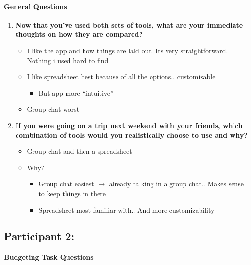 \documentclass[12pt,a4paper]{article}
\begin{document}
\paragraph{General Questions}

\begin{enumerate}
    \item \textbf{Now that you’ve used both sets of tools, what are your immediate thoughts on how they are compared?}
    \begin{itemize}
        \item I like the app and how things are laid out. Its very straightforward. Nothing i used hard to find
        \item I like spreadsheet best because of all the options.. customizable
        \begin{itemize}
            \item But app more ``intuitive''
        \end{itemize}
        \item Group chat worst
    \end{itemize}

    \item \textbf{If you were going on a trip next weekend with your friends, which combination of tools would you realistically choose to use and why?}
    \begin{itemize}
        \item Group chat and then a spreadsheet
        \item Why?
        \begin{itemize}
            \item Group chat easiest $\rightarrow$ already talking in a group chat.. Makes sense to keep things in there
            \item Spreadsheet most familiar with.. And more customizability
        \end{itemize}
    \end{itemize}
\end{enumerate}

\subsection{Participant 2:}
\paragraph{Budgeting Task Questions}
\end{document}
